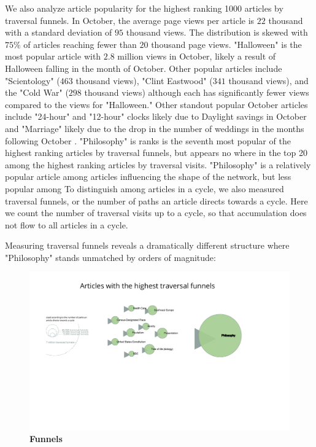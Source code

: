 \documentclass[pre,twocolumn,twoside,superscriptaddress,floatfix, aps, 10pt]{revtex4-1}
\begin{document}
We also analyze article popularity for the highest ranking 1000 articles by 
traversal funnels. In October, the average page views per article is 
$22$ thousand with a standard deviation of $95$ thousand views. The distribution
is skewed with $75\%$ of articles reaching fewer than $20$ thousand page views. 
"Halloween" is the most popular article with $2.8$ million views in October,
likely a result of Halloween falling in the month of October. 
Other popular articles include "Scientology" ($463$ thousand views), "Clint Eastwood" 
($341$ thousand views),
and the "Cold War" ($298$ thousand views) although each has significantly fewer views compared to the views for "Halloween."
Other standout popular October articles include "24-hour" and "12-hour" clocks likely due
to Daylight savings in October and "Marriage" likely due to the drop in the number of
weddings in the months following October
\cite{weddings}.
"Philosophy" is ranks is the seventh most popular of the highest ranking articles by traversal funnels, but appears no where in the top 20 among the highest ranking
articles by traversal visits. "Philosophy" is a relatively popular article 
among articles influencing the shape of the network, but less popular among 
To distinguish among articles in a cycle, we also measured traversal funnels, or the number of 
paths an article directs towards a cycle. Here we count the number of traversal visits up to a cycle, 
so that accumulation does not flow to all articles in a cycle.

Measuring traversal funnels reveals a dramatically different structure where "Philosophy" stands unmatched by orders of magnitude:

\begin{figure}[tp!]
  \centering	
  \includegraphics[width=\textwidth]{graphics/funnels.pdf}
  \caption{
    \textbf{Funnels}
  }
  \label{fig:Funnels}
\end{figure}
\end{document}
